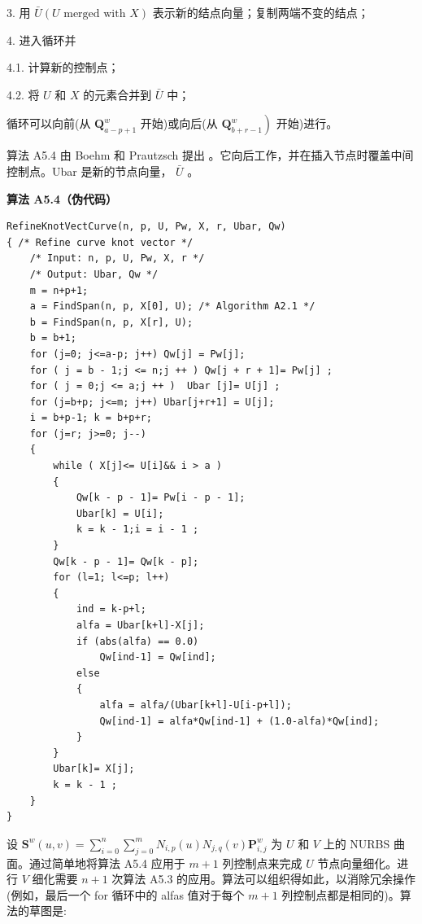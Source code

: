 \documentclass[../main.tex]{subfiles}
\begin{document}
3. 用 \(\bar{U}\left( {U\text{ merged with }X}\right)\) 表示新的结点向量；复制两端不变的结点；

4. 进入循环并

4.1. 计算新的控制点；

4.2. 将 \(U\) 和 \(X\) 的元素合并到 \(\bar{U}\) 中；

循环可以向前(从 \({\mathbf{Q}}_{a - p + 1}^{w}\) 开始)或向后(从 \(\left. {\mathbf{Q}}_{b + r - 1}^{w}\right)\) 开始)进行。





算法 A5.4 由 Boehm 和 Prautzsch 提出 \cite{Boeh85a}。它向后工作，并在插入节点时覆盖中间控制点。Ubar 是新的节点向量， \(\bar{U}\) 。

\par\medskip\noindent\textbf{算法 A5.4（伪代码）}\par
\begin{verbatim}
RefineKnotVectCurve(n, p, U, Pw, X, r, Ubar, Qw)
{ /* Refine curve knot vector */
    /* Input: n, p, U, Pw, X, r */
    /* Output: Ubar, Qw */
    m = n+p+1;
    a = FindSpan(n, p, X[0], U); /* Algorithm A2.1 */
    b = FindSpan(n, p, X[r], U);
    b = b+1;
    for (j=0; j<=a-p; j++) Qw[j] = Pw[j];
    for ( j = b - 1;j <= n;j ++ ) Qw[j + r + 1]= Pw[j] ;
    for ( j = 0;j <= a;j ++ )  Ubar [j]= U[j] ;
    for (j=b+p; j<=m; j++) Ubar[j+r+1] = U[j];
    i = b+p-1; k = b+p+r;
    for (j=r; j>=0; j--)
    {
        while ( X[j]<= U[i]&& i > a )
        {
            Qw[k - p - 1]= Pw[i - p - 1];
            Ubar[k] = U[i];
            k = k - 1;i = i - 1 ;
        }
        Qw[k - p - 1]= Qw[k - p];
        for (l=1; l<=p; l++)
        {
            ind = k-p+l;
            alfa = Ubar[k+l]-X[j];
            if (abs(alfa) == 0.0)
                Qw[ind-1] = Qw[ind];
            else
            {
                alfa = alfa/(Ubar[k+l]-U[i-p+l]);
                Qw[ind-1] = alfa*Qw[ind-1] + (1.0-alfa)*Qw[ind];
            }
        }
        Ubar[k]= X[j];
        k = k - 1 ;
    }
}
\end{verbatim}

设 \({\mathbf{S}}^{w}\left( {u,v}\right)  = \mathop{\sum }\limits_{{i = 0}}^{n}\mathop{\sum }\limits_{{j = 0}}^{m}{N}_{i,p}\left( u\right) {N}_{j,q}\left( v\right) {\mathbf{P}}_{i,j}^{w}\) 为 \(U\) 和 \(V\) 上的 NURBS 曲面。通过简单地将算法 A5.4 应用于 \(m + 1\) 列控制点来完成 \(U\) 节点向量细化。进行 \(V\) 细化需要 \(n + 1\) 次算法 A5.3 的应用。算法可以组织得如此，以消除冗余操作(例如，最后一个 for 循环中的 alfas 值对于每个 \(m + 1\) 列控制点都是相同的)。算法的草图是:
\end{document}

